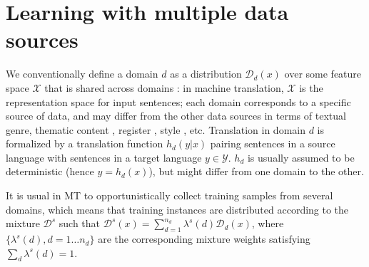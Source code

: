 \documentclass[11pt,a4paper]{article}
\begin{document}

\section{Learning with multiple data sources} \label{sec:mdmt}

We conventionally define a domain $d$ as a distribution $\mathcal{D}_d(x)$ over some feature space $\mathcal{X}$ that is shared across domains \citep{Pan10asurvey}: in machine translation, $\mathcal{X}$ is the representation space for input sentences; each domain corresponds to a specific source of data, and may differ from the other data sources in terms of textual genre, thematic content \cite{Chen16guided,Zhang16topicinformed}, register \cite{Sennrich16politeness}, style \cite{Niu18multitask}, etc. Translation in domain $d$ is formalized by a translation function $h_d(y|x)$ pairing sentences in a source language with sentences in a target language $y \in \mathcal{Y}$. $h_d$ is usually assumed to be deterministic (hence $y = h_d(x)$), but might differ from one domain to the other.

It is usual in MT to opportunistically collect training samples from several domains, which means that training instances are distributed according to the mixture $\mathcal{D}^s$ such that $\mathcal{D}^s(x) = \sum_{d=1}^{n_d} \lambda^{s}(d) \mathcal{D}_d(x)$, where $\{\lambda^{s}(d), d=1 \dots n_d\}$ are the corresponding mixture weights satisfying $\sum_d \lambda^{s}(d)=1$.
\end{document}
